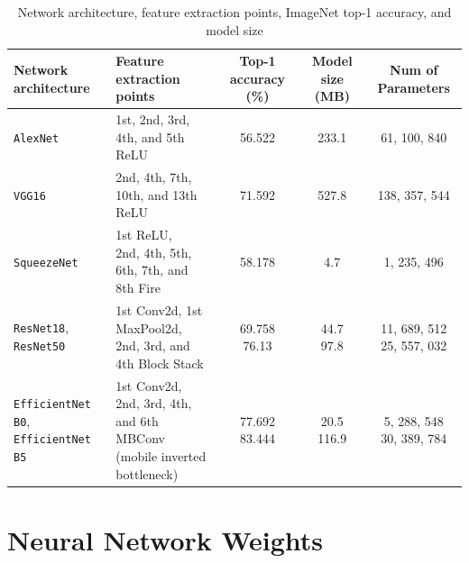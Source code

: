\documentclass[sigconf]{acmart}
\begin{document}
\begin{table}[!htbp]
    \centering
    \caption{Network architecture, feature extraction points, ImageNet top-1 accuracy, and model size}
    \begin{tabular}{l l c c c} 
        \toprule 
        Network architecture & Feature extraction points & Top-1 accuracy (\%) & Model size (MB) & Num of Parameters \\ 
        \midrule 
        \texttt{AlexNet} & 1st, 2nd, 3rd, 4th, and 5th ReLU & 56.522 & 233.1 & 61, 100, 840\\ \hline 
        \texttt{VGG16} & 2nd, 4th, 7th, 10th, and 13th ReLU & 71.592 & 527.8 & 138, 357, 544 \\ \hline 
        \texttt{SqueezeNet} & \shortstack[l]{1st ReLU, \\ 2nd, 4th, 5th, 6th, 7th, and 8th Fire} & 58.178 & 4.7 & 1, 235, 496 \\ \hline 
         \shortstack[l]{\texttt{ResNet18}, \\ \texttt{ResNet50}} &  \shortstack[l]{1st Conv2d, 1st MaxPool2d, \\2nd, 3rd, and 4th Block Stack} & \shortstack[c]{69.758 \\ 76.13 } & \shortstack[c]{44.7 \\ 97.8 } & \shortstack[c]{11, 689, 512 \\ 25, 557, 032}\\\hline 
         \shortstack[l]{\texttt{EfficientNet B0}, \\ \texttt{EfficientNet B5}} & \shortstack[l]{1st Conv2d, \\ 2nd, 3rd, 4th, and 6th MBConv \\(mobile inverted bottleneck)} & \shortstack[c]{77.692 \\ 83.444} & \shortstack[c]{20.5 \\ 116.9 } & \shortstack[c]{5, 288, 548 \\ 30, 389, 784}\\ 
         \bottomrule
    \end{tabular}
    \label{tab:extraction_points}
\end{table}

\section{Neural Network Weights}
\label{sec:neural_network_weights}
\end{document}

